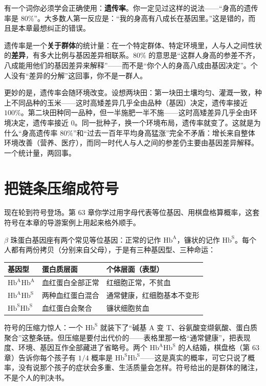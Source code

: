 \begin{qiaoliang}
有一个词你必须学会正确使用：\textbf{遗传率}。你一定见过这样的说法——“身高的遗传率是 $80\%$”。大多数人第一反应是：“我的身高有八成长在基因里。”这是错的，而且是本章最想纠正的错误。

遗传率是一个\textbf{关于群体}的统计量：在一个特定群体、特定环境里，人与人之间性状的\textbf{差异}，有多大比例与基因差异相联系。$80\%$ 的意思是“这群人身高的参差不齐，八成能用他们的基因差异来解释”——而不是“你个人的身高八成由基因决定”。个人没有“差异的分解”这回事，你不是一群人。

更妙的是，遗传率会随环境改变。设想两块田：第一块田土壤均匀、灌溉一致，种上不同品种的玉米——这时高矮差异几乎全由品种（基因）决定，遗传率接近 $100\%$。第二块田种同一品种，但一半施肥一半不施——这时高矮差异几乎全由环境决定，遗传率接近 $0$。同一批种子，换一个环境布局，遗传率就变了。这就是为什么“身高遗传率 $80\%$”和“过去一百年平均身高猛涨”完全不矛盾：增长来自整体环境改善（营养、医疗），而同一时代人与人之间的参差仍主要由基因差异解释。一个统计量，两回事。
\end{qiaoliang}

\section{把链条压缩成符号}

现在轮到符号登场。第 63 章你学过用字母代表等位基因、用棋盘格算概率，这套符号在本章的导游案例上用起来格外顺手。

$\beta$ 珠蛋白基因座有两个常见等位基因：正常的记作 $\mathrm{Hb^{A}}$，镰状的记作 $\mathrm{Hb^{S}}$。每个人都有两份拷贝（分别来自父母），于是有三种基因型、三种命运：

\begin{table}[h]
\centering
\begin{tabular}{@{}lll@{}}
\toprule
基因型 & 蛋白质层面 & 个体层面（表型） \\
\midrule
$\mathrm{Hb^{A}Hb^{A}}$ & 血红蛋白全部正常 & 红细胞正常，不贫血 \\
$\mathrm{Hb^{A}Hb^{S}}$ & 两种血红蛋白混合 & 通常健康，红细胞基本不变形 \\
$\mathrm{Hb^{S}Hb^{S}}$ & 血红蛋白会聚合 & 镰状细胞贫血 \\
\bottomrule
\end{tabular}
\end{table}

符号的压缩力惊人：一个 $\mathrm{Hb^{S}}$ 就装下了“碱基 A 变 T、谷氨酸变缬氨酸、蛋白质聚合”这整条链。但压缩是要付出代价的——表格里那一格“通常健康”，把表现度、环境、基因互作全部藏进了省略号。两个 $\mathrm{Hb^{A}Hb^{S}}$ 的人结婚，棋盘格（第 63 章）告诉你每个孩子有 $1/4$ 概率是 $\mathrm{Hb^{S}Hb^{S}}$——这是真实的概率，可它只说了概率，没有说那个孩子的症状会多重、生活质量会怎样。符号给出的是群体的赌注，不是个人的判决书。

